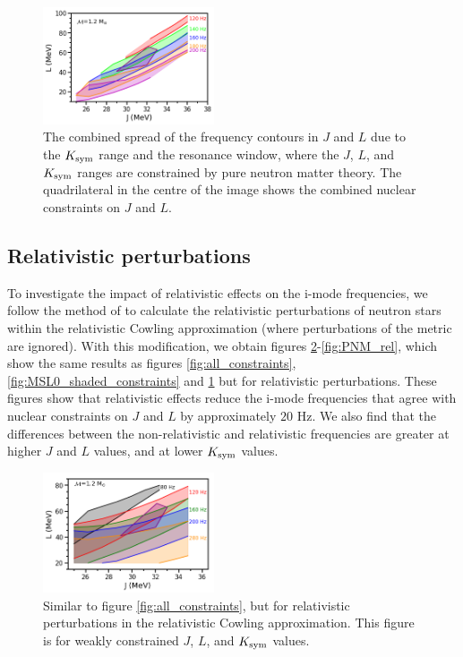 \documentclass[fleqn,usenatbib]{mnras}
\begin{document}
\begin{figure}
\centering
\includegraphics[width=0.45\textwidth,angle=0]{PNM_JL_res_spread_smoothed}
\caption{The combined spread of the frequency contours in $J$ and $L$ due to the $K_{\rm sym}$ range and the resonance window, where the $J$, $L$, and $K_{\rm sym}$ ranges are constrained by pure neutron matter theory. The quadrilateral in the centre of the image shows the combined nuclear constraints on $J$ and $L$.}
\label{fig:PNM_JL_res_spread}
\end{figure}





\subsection{Relativistic perturbations}
\hspace{\parindent}To investigate the impact of relativistic effects on the i-mode frequencies, we follow the method of \citet{yoshida2002nonradial} to calculate the relativistic perturbations of neutron stars within the relativistic Cowling approximation \citet{mcdermott1983nonradial} (where perturbations of the metric are ignored). With this modification, we obtain figures \ref{fig:grid_rel}-\ref{fig:PNM_rel}, which show the same results as figures \ref{fig:all_constraints}, \ref{fig:MSL0_shaded_constraints} and \ref{fig:PNM_JL_res_spread} but for relativistic perturbations. These figures show that relativistic effects reduce the i-mode frequencies that agree with nuclear constraints on $J$ and $L$ by approximately $20$ Hz. We also find that the differences between the non-relativistic and relativistic frequencies are greater at higher $J$ and $L$ values, and at lower $K_{\rm sym}$ values.


\begin{figure}
\centering
\includegraphics[width=0.45\textwidth,angle=0]{JL_spread_due_to_Ksym_and_df_grid_rel.png}
\caption{Similar to figure \ref{fig:all_constraints}, but for relativistic perturbations in the relativistic Cowling approximation. This figure is for weakly constrained $J$, $L$, and $K_{\rm sym}$ values.}
\label{fig:grid_rel}
\end{figure}
\end{document}
